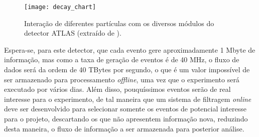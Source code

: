 \begin{figure}
\begin{center}
\texttt{[image: decay\_chart]}
\caption[Interação de diferentes partículas com os diversos módulos do detector ATLAS.]{Interação de diferentes partículas com os diversos módulos do detector ATLAS (extraído de \cite{bib:site_atlas}).}
\label{FIG:INTERACAO_PARTICULAS_ATLAS}
\end{center}
\end{figure}


Espera-se, para este detector, que cada evento gere aproximadamente 1 Mbyte de informação, mas como a taxa de geração de eventos é de 40 MHz, o fluxo de dados será da ordem de 40 TBytes por segundo, o que é um valor impossível de ser armazenado para processamento \emph{offline}, uma vez que o experimento será executado por vários dias. Além disso, pouquíssimos eventos serão de real interesse para o experimento, de tal maneira que um sistema de filtragem \emph{online} deve ser desenvolvido para selecionar somente os eventos de potencial interesse para o projeto, descartando os que não apresentem informação nova, reduzindo desta maneira, o fluxo de informação a ser armazenada para posterior análise.
